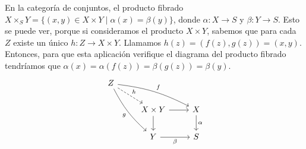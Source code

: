 \documentclass[GA.tex]{subfiles}
\begin{document}
\begin{ej}
En la categoría de conjuntos, el producto fibrado $X\times_{S} Y=\{(x,y)\in X\times Y\mid \alpha(x)=\beta(y)\}$, donde $\alpha:X\to S$ y $\beta:Y\to S$. Esto se puede ver, porque si consideramos el producto $X\times Y$, sabemos que para cada $Z$ existe un único $h:Z\to X\times Y$. Llamamos $h(z)=(f(z),g(z))=(x,y)$. Entonces, para que esta aplicación verifique el diagrama del producto fibrado tendríamos que $\alpha(x)=\alpha(f(z))=\beta(g(z))=\beta(y)$. 
\[
\begin{tikzcd}
Z\arrow[dr, dashed, "h"]\arrow[drr, bend left=10, "f"]\arrow[ddr, bend right=10, "g"'] & &\\ 
& X\times Y\arrow[r]\arrow[d] & X\arrow[d, "\alpha"]\\
& Y\arrow[r, "\beta"'] & S
\end{tikzcd}
\]
\end{ej}
\end{document}
